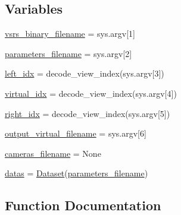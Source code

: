 \subsection*{Variables}
\begin{DoxyCompactItemize}
\item 
\hyperlink{namespacerun__vsrs_adf3ba948a5f8384031e8473a315dd950}{vsrs\+\_\+binary\+\_\+filename} = sys.\+argv\mbox{[}1\mbox{]}
\item 
\hyperlink{namespacerun__vsrs_a897778277f6ec39488136adbaae60614}{parameters\+\_\+filename} = sys.\+argv\mbox{[}2\mbox{]}
\item 
\hyperlink{namespacerun__vsrs_abe5122b51fc6f6d3cbc026cdd89ed0c0}{left\+\_\+idx} = decode\+\_\+view\+\_\+index(sys.\+argv\mbox{[}3\mbox{]})
\item 
\hyperlink{namespacerun__vsrs_a3980f369a001df8bf6754ee4db9cb31c}{virtual\+\_\+idx} = decode\+\_\+view\+\_\+index(sys.\+argv\mbox{[}4\mbox{]})
\item 
\hyperlink{namespacerun__vsrs_aed17ae07d2eb1b1bb9be548e43d57cf0}{right\+\_\+idx} = decode\+\_\+view\+\_\+index(sys.\+argv\mbox{[}5\mbox{]})
\item 
\hyperlink{namespacerun__vsrs_ab202a2d5cb4c68a83ecfc5781f284f16}{output\+\_\+virtual\+\_\+filename} = sys.\+argv\mbox{[}6\mbox{]}
\item 
\hyperlink{namespacerun__vsrs_ae2016f4c5aecea18c3e0b313b26618cd}{cameras\+\_\+filename} = None
\item 
\hyperlink{namespacerun__vsrs_abed6970d28e59cb146251f3a2aa3660b}{datas} = \hyperlink{classpylib_1_1dataset_1_1Dataset}{Dataset}(\hyperlink{namespacerun__vsrs_a897778277f6ec39488136adbaae60614}{parameters\+\_\+filename})
\end{DoxyCompactItemize}


\subsection{Function Documentation}
